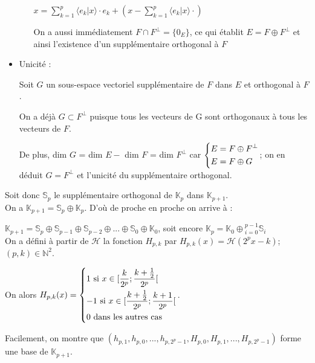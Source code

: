 \documentclass{article}
\begin{document}
\begin{itemize}
\begin{itemize}
$x = \sum_{k = 1}^p \langle e_k | x \rangle{}\cdot{}e_k + (x - \sum_{k = 1}^p \langle e_k | x \rangle{}\cdot{})$

On a aussi immédiatement $F \cap F^{\perp} = \{0_E\}$, ce qui établit $E = F \oplus F^{\perp}$ et ainsi l'existence d'un supplémentaire orthogonal à $F$ 
\end{itemize}

\item Unicité :

Soit $G$ un sous-espace vectoriel supplémentaire de $F$ dans $E$ et orthogonal à $F$.

On a déjà $G \subset F^{\perp}$ puisque tous les vecteurs de G sont orthogonaux à tous les vecteurs de $F$.

De plus, dim $G$ = dim $E -$ dim $F$ = dim $F^{\perp}$ car $\begin{dcases} E = F \oplus F^{\perp} \\ E = F \oplus G \end{dcases}$; on en déduit $G = F^{\perp}$ et l'unicité du supplémentaire orthogonal. \\
\end{itemize}

Soit donc $\mathbb{S}_{p}$ le supplémentaire orthogonal de $\mathbb{K}_p$ dans $\mathbb{K}_{p+1}$. \\

On a $\mathbb{K}_{p+1} = \mathbb{S}_{p} \oplus \mathbb{K}_p$. D'où de proche en proche on arrive à :

$\mathbb{K}_{p+1} = \mathbb{S}_{p} \oplus \mathbb{S}_{p-1} \oplus \mathbb{S}_{p-2} \oplus ... \oplus \mathbb{S}_{0} \oplus \mathbb{K}_{0}$, soit encore $\mathbb{K}_p = \mathbb{K}_0 \oplus{}_{i = 0}^{p-1} \mathbb{S}_{i    } $ \\

On a défini à partir de $\mathcal{H}$ la fonction $H_{p,k}$ par $H_{p,k}(x) = \mathcal{H}(2^{p}x - k )$; $(p,k) \in \mathbb{N}^2$.

On alors $H_{p,k}(x) =  \begin{dcases} 1 \text{ si } x \in [\frac{k}{2^p};\frac{k + \frac{1}{2}}{2^p}[ \\ 
-1 \text{ si } x \in [\frac{k + \frac{1}{2}}{2^p};\frac{k + 1}{2^p}[ \\
0 \text{ dans les autres cas } \end{dcases}$.

Facilement, on montre que $(h_{p,1},h_{p,0},...,h_{p,2^p - 1},H_{p,0},H_{p,1},...,H_{p,2^p - 1})$ forme une base de $\mathbb{K}_{p+1}$.
\end{document}
